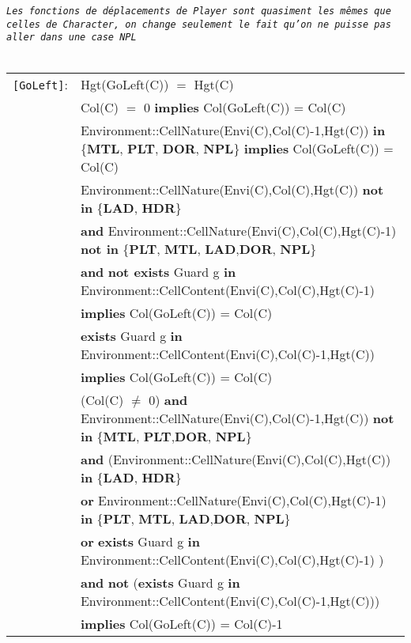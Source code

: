 \documentclass[7pt]{article}
\begin{document}
\texttt{\textit{Les fonctions de déplacements de Player sont quasiment les mêmes que celles de Character, on change seulement le fait qu'on ne puisse pas aller dans une case NPL}} \\ \\

\begin{tabular}{rl}
\texttt{[GoLeft]}: & \textrm{Hgt(GoLeft(C))} $=$ \textrm{Hgt(C)} \\
& \textrm{Col(C)} $=$ 0 \textbf{implies} \textrm{Col(GoLeft(C))} = \textrm{Col(C)} \\
& \textrm{Environment::CellNature(Envi(C),Col(C)-1,Hgt(C))} \textbf{in} \{\textbf{MTL}, \textbf{PLT}, \textbf{DOR}, \textbf{NPL}\} \textbf{implies} \textrm{Col(GoLeft(C))} = \textrm{Col(C)} \\
& \textrm{Environment::CellNature(Envi(C),Col(C),Hgt(C))} \textbf{not in} \{\textbf{LAD}, \textbf{HDR}\}
\\ & \quad\quad \textbf{and} \textrm{Environment::CellNature(Envi(C),Col(C),Hgt(C)-1)} \textbf{not in} \{\textbf{PLT}, \textbf{MTL}, \textbf{LAD},\textbf{DOR}, \textbf{NPL}\} \\
& \quad\quad \textbf{and} \textbf{not exists} \textrm{Guard} g \textbf{in} \textrm{Environment::CellContent(Envi(C),Col(C),Hgt(C)-1)} \\
& \quad\quad \textbf{implies} \textrm{Col(GoLeft(C))} = \textrm{Col(C)} \\
& \textbf{exists} \textrm{Guard} g \textbf{in} \textrm{Environment::CellContent(Envi(C),Col(C)-1,Hgt(C))} \\ & \quad\quad \textbf{implies} \textrm{Col(GoLeft(C))} = \textrm{Col(C)} \\
& (\textrm{Col(C)} $\neq$ 0) \textbf{and} \textrm{Environment::CellNature(Envi(C),Col(C)-1,Hgt(C))} \textbf{not in} \{\textbf{MTL}, \textbf{PLT},\textbf{DOR}, \textbf{NPL}\} \\
& \quad\quad \textbf{and} (\textrm{Environment::CellNature(Envi(C),Col(C),Hgt(C))} \textbf{in} \{\textbf{LAD}, \textbf{HDR}\} \\
& \quad\quad\quad\quad \textbf{or} \textrm{Environment::CellNature(Envi(C),Col(C),Hgt(C)-1)} \textbf{in} \{\textbf{PLT}, \textbf{MTL}, \textbf{LAD},\textbf{DOR}, \textbf{NPL}\} \\
& \quad\quad\quad\quad \textbf{or} \textbf{exists} \textrm{Guard} g \textbf{in} \textrm{Environment::CellContent(Envi(C),Col(C),Hgt(C)-1)} ) \\
& \quad\quad \textbf{and} \textbf{not} (\textbf{exists} \textrm{Guard} g \textbf{in} \textrm{Environment::CellContent(Envi(C),Col(C)-1,Hgt(C))}) \\
& \quad\quad \textbf{implies} \textrm{Col(GoLeft(C))} = \textrm{Col(C)}-1 \\


\end{tabular}
\end{document}
